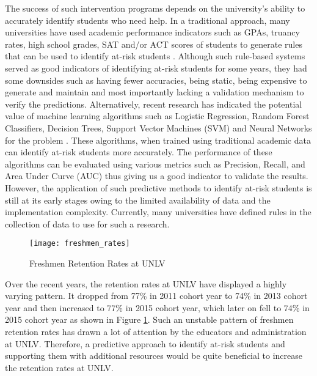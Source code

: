 \documentclass[11pt,openright]{report}
\begin{document}
The success of such intervention programs depends on the university's ability to accurately identify students who need help. In a traditional approach, many universities have used academic performance indicators such as GPAs, truancy rates, high school grades, SAT and/or ACT scores of students to generate rules that can be used to identify at-risk  students \cite{bingham2016}. Although such rule-based systems served as good indicators of identifying at-risk students for some years, they had some downsides such as having fewer accuracies, being static, being expensive to generate and maintain and most importantly lacking a validation mechanism to verify the predictions. Alternatively, recent research has indicated the potential value of machine learning algorithms such as Logistic Regression, Random Forest Classifiers, Decision Trees, Support Vector Machines (SVM) and Neural Networks for the problem \cite{plagge2013using,lakkaraju2015machine,marbouti2016models}. These algorithms, when trained using traditional academic data can identify at-risk students more accurately. The performance of these algorithms can be evaluated using various metrics such as Precision, Recall, and Area Under Curve (AUC) thus giving us a good indicator to validate the results. However, the application of such predictive methods to identify at-risk students is still at its early stages owing to the limited availability of data and the implementation complexity. Currently, many universities have defined rules in the collection of data to use for such a research.
\begin{figure}
	\centering
	\texttt{[image: freshmen\_rates]}
	\caption{Freshmen Retention Rates at UNLV}
	\label{fig:unlv_retention_trend}
\end{figure}

Over the recent years, the retention rates at UNLV have displayed a highly varying pattern. It dropped from 77\% in 2011 cohort year to 74\% in 2013 cohort year and then increased to 77\% in 2015 cohort year, which later on fell to 74\% in 2015 cohort year as shown in Figure \ref{fig:unlv_retention_trend}. Such an unstable pattern of freshmen retention rates has drawn a lot of attention by the educators and administration at UNLV. Therefore, a predictive approach to identify at-risk students and supporting them with additional resources would be quite beneficial to increase the retention rates at UNLV. 
\end{document}
